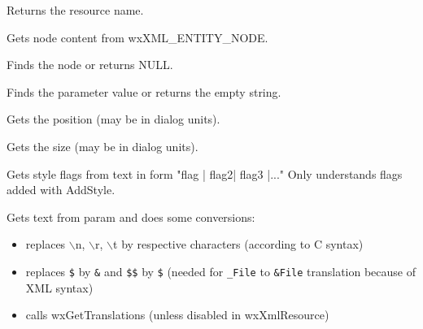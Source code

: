 \label{wxxmlresourcehandlergetname}


Returns the resource name.

\label{wxxmlresourcehandlergetnodecontent}


Gets node content from wxXML\_ENTITY\_NODE.

\label{wxxmlresourcehandlergetparamnode}


Finds the node or returns NULL.

\label{wxxmlresourcehandlergetparamvalue}


Finds the parameter value or returns the empty string.

\label{wxxmlresourcehandlergetposition}


Gets the position (may be in dialog units).

\label{wxxmlresourcehandlergetsize}


Gets the size (may be in dialog units).

\label{wxxmlresourcehandlergetstyle}


Gets style flags from text in form "flag | flag2| flag3 |..."
Only understands flags added with AddStyle.

\label{wxxmlresourcehandlergettext}


Gets text from param and does some conversions:

\begin{itemize}\itemsep=0pt
\item replaces $\backslash$n, $\backslash$r, $\backslash$t by respective characters (according to C syntax)
\item replaces {\tt\$} by {\tt\&} and {\tt\$\$} by {\tt\$} (needed for {\tt\_File} to {\tt\&File}
translation because of XML syntax)
\item calls wxGetTranslations (unless disabled in wxXmlResource)
\end{itemize}

